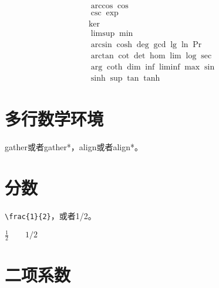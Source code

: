 \documentclass[12pt,oneside]{book}
\begin{document}
\begin{common-format}
\begin{gather*}
\arccos \cos \\
\csc \exp \\
\ker \\
\limsup \min \\ 
\arcsin \cosh \deg \gcd \lg \ln \Pr \\ 
\arctan \cot \det \hom \lim \log \sec \\
\arg \coth \dim \inf \liminf \max \sin \\
\sinh \sup \tan \tanh
\end{gather*}

\section{多行数学环境}
gather或者gather*，align或者align*。

\section{分数}
\verb+\frac{1}{2}+，或者1/2。

$\frac{1}{2} \qquad 1/2$

\section{二项系数}







\end{common-format}
\end{document}
